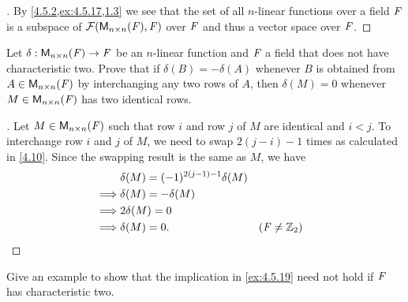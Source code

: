 \begin{proof}[]
  By \cref{4.5.2,ex:4.5.17,1.3} we see that the set of all \(n\)-linear functions over a field \(\mathit{F}\) is a subspace of \(\mathcal{F}(\mathsf{M}_{{n} \times n}({\mathit{F}}), \mathit{F})\) over \(\mathit{F}\) and thus a vector space over \(\mathit{F}\).
\end{proof}

\begin{ex}\label{ex:4.5.19}
  Let \(\delta : \mathsf{M}_{{n} \times n}({\mathit{F}}) \to \mathit{F}\) be an \(n\)-linear function and \(\mathit{F}\) a field that does not have characteristic two.
  Prove that if \(\delta(B) = -\delta(A)\) whenever \(B\) is obtained from \(A \in \mathsf{M}_{{n} \times n}({\mathit{F}})\) by interchanging any two rows of \(A\), then \(\delta(M) = 0\) whenever \(M \in \mathsf{M}_{{n} \times n}({\mathit{F}})\) has two identical rows.
\end{ex}

\begin{proof}[]
  Let \(M \in \mathsf{M}_{{n} \times n}({\mathit{F}})\) such that row \(i\) and row \(j\) of \(M\) are identical and \(i < j\).
  To interchange row \(i\) and \(j\) of \(M\), we need to swap \(2(j - i) - 1\) times as calculated in \cref{4.10}.
  Since the swapping result is the same as \(M\), we have
  \begin{align*}
             & \delta(M) = (-1)^{2(j - 1) - 1} \delta(M)                     \\
    \implies & \delta(M) = -\delta(M)                                        \\
    \implies & 2\delta(M) = 0                                                \\
    \implies & \delta(M) = 0.                            &  & (\mathit{F} \neq \mathbb{Z}_2)
  \end{align*}
\end{proof}

\begin{ex}\label{ex:4.5.20}
  Give an example to show that the implication in \cref{ex:4.5.19} need not hold if \(\mathit{F}\) has characteristic two.
\end{ex}

